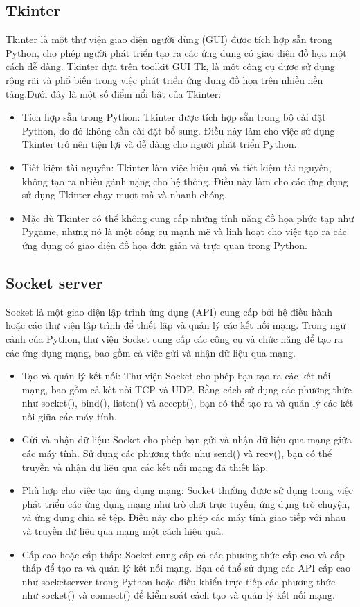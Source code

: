 \documentclass[a4paper]{article}
\begin{document}
\subsection{Tkinter}
Tkinter là một thư viện giao diện người dùng (GUI) được tích hợp sẵn trong Python, cho phép người phát triển tạo ra các ứng dụng có giao diện đồ họa một cách dễ dàng. Tkinter dựa trên toolkit GUI Tk, là một công cụ được sử dụng rộng rãi và phổ biến trong việc phát triển ứng dụng đồ họa trên nhiều nền tảng.Dưới đây là một số điểm nổi bật của Tkinter:
\begin{itemize}
    \item Tích hợp sẵn trong Python: Tkinter được tích hợp sẵn trong bộ cài đặt Python, do đó không cần cài đặt bổ sung. Điều này làm cho việc sử dụng Tkinter trở nên tiện lợi và dễ dàng cho người phát triển Python.
    \item Tiết kiệm tài nguyên: Tkinter làm việc hiệu quả và tiết kiệm tài nguyên, không tạo ra nhiều gánh nặng cho hệ thống. Điều này làm cho các ứng dụng sử dụng Tkinter chạy mượt mà và nhanh chóng.
    \item Mặc dù Tkinter có thể không cung cấp những tính năng đồ họa phức tạp như Pygame, nhưng nó là một công cụ mạnh mẽ và linh hoạt cho việc tạo ra các ứng dụng có giao diện đồ họa đơn giản và trực quan trong Python.
\end{itemize}

\subsection{Socket server}
Socket là một giao diện lập trình ứng dụng (API) cung cấp bởi hệ điều hành hoặc các thư viện lập trình để thiết lập và quản lý các kết nối mạng. Trong ngữ cảnh của Python, thư viện Socket cung cấp các công cụ và chức năng để tạo ra các ứng dụng mạng, bao gồm cả việc gửi và nhận dữ liệu qua mạng.
\begin{itemize}
    \item Tạo và quản lý kết nối: Thư viện Socket cho phép bạn tạo ra các kết nối mạng, bao gồm cả kết nối TCP và UDP. Bằng cách sử dụng các phương thức như socket(), bind(), listen() và accept(), bạn có thể tạo ra và quản lý các kết nối giữa các máy tính.
    \item Gửi và nhận dữ liệu: Socket cho phép bạn gửi và nhận dữ liệu qua mạng giữa các máy tính. Sử dụng các phương thức như send() và recv(), bạn có thể truyền và nhận dữ liệu qua các kết nối mạng đã thiết lập.
    \item Phù hợp cho việc tạo ứng dụng mạng: Socket thường được sử dụng trong việc phát triển các ứng dụng mạng như trò chơi trực tuyến, ứng dụng trò chuyện, và ứng dụng chia sẻ tệp. Điều này cho phép các máy tính giao tiếp với nhau và truyền dữ liệu qua mạng một cách hiệu quả.
    \item Cấp cao hoặc cấp thấp: Socket cung cấp cả các phương thức cấp cao và cấp thấp để tạo ra và quản lý kết nối mạng. Bạn có thể sử dụng các API cấp cao như socketserver trong Python hoặc điều khiển trực tiếp các phương thức như socket() và connect() để kiểm soát cách tạo và quản lý kết nối mạng.
\end{itemize}
\end{document}
